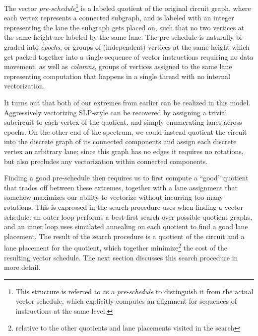 The vector {\em pre-schedule}\footnote{This structure is referred to as a {\em pre-schedule} to distinguish it from the actual vector schedule, which explicitly computes an alignment for sequences of instructions at the same level. %
} is a labeled quotient of the original circuit graph, where each vertex represents a connected subgraph, and is labeled with an integer representing the lane the subgraph gets placed on, such that no two vertices at the same height are labeled by the same lane.
The pre-schedule is naturally bi-graded into {\em epochs}, or groups of (independent) vertices at the same height which get packed together into a single sequence of vector instructions requiring no data movement, as well as {\em columns}, groups of vertices assigned to the same lane representing computation that happens in a single thread with no internal vectorization.

It turns out that both of our extremes from earlier can be realized in this model.
Aggressively vectorizing SLP-style can be recovered by assigning a trivial subcircuit to each vertex of the quotient, and simply enumerating lanes across epochs.
On the other end of the spectrum, we could instead quotient the circuit into the discrete graph of its connected components and assign each discrete vertex an arbitrary lane; since this graph has no edges it requires no rotations, but also precludes any vectorization within connected components.

Finding a good pre-schedule then requires us to first compute a ``good'' quotient that trades off between these extremes, together with a lane assignment that somehow maximizes our ability to vectorize without incurring too many rotations.
This is expressed in the search procedure \system uses when finding a vector schedule: an outer loop performs a best-first search over possible quotient graphs, and an inner loop uses simulated annealing on each quotient to find a good lane placement. 
The result of the search procedure is a quotient of the circuit and a lane placement for the quotient, which together minimize\footnote{relative to the other quotients and lane placements visited in the search} the cost of the resulting vector schedule. %
The next section discusses this search procedure in more detail.

